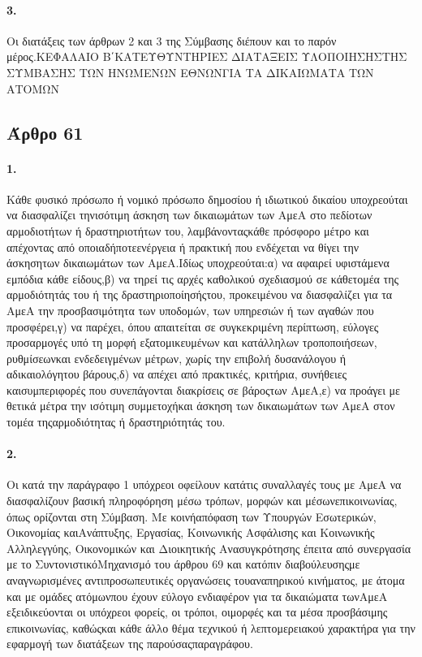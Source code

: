 \documentclass[a4paper,oneside, 10pt]{book}
\begin{document}
\paragraph { 3. } Οι διατάξεις των άρθρων 2 και 3 της Σύμβασης διέπουν και το παρόν μέρος.ΚΕΦΑΛΑΙΟ Β΄ΚΑΤΕΥΘΥΝΤΗΡΙΕΣ ΔΙΑΤΑΞΕΙΣ ΥΛΟΠΟΙΗΣΗΣΤΗΣ ΣΥΜΒΑΣΗΣ ΤΩΝ ΗΝΩΜΕΝΩΝ ΕΘΝΩΝΓΙΑ ΤΑ ΔΙΚΑΙΩΜΑΤΑ ΤΩΝ ΑΤΟΜΩΝ
\subsection*{ Άρθρο 61 }
\paragraph { 1. } Κάθε φυσικό πρόσωπο ή νομικό πρόσωπο δημοσίου ή ιδιωτικού δικαίου υποχρεούται να διασφαλίζει τηνισότιμη άσκηση των δικαιωμάτων των ΑμεΑ στο πεδίοτων αρμοδιοτήτων ή δραστηριοτήτων του, λαμβάνονταςκάθε πρόσφορο μέτρο και απέχοντας από οποιαδήποτεενέργεια ή πρακτική που ενδέχεται να θίγει την άσκησητων δικαιωμάτων των ΑμεΑ.Ιδίως υποχρεούται:α) να αφαιρεί υφιστάμενα εμπόδια κάθε είδους,β) να τηρεί τις αρχές καθολικού σχεδιασμού σε κάθετομέα της αρμοδιότητάς του ή της δραστηριοποίησήςτου, προκειμένου να διασφαλίζει για τα ΑμεΑ την προσβασιμότητα των υποδομών, των υπηρεσιών ή των αγαθών που προσφέρει,γ) να παρέχει, όπου απαιτείται σε συγκεκριμένη περίπτωση, εύλογες προσαρμογές υπό τη μορφή εξατομικευμένων και κατάλληλων τροποποιήσεων, ρυθμίσεωνκαι ενδεδειγμένων μέτρων, χωρίς την επιβολή δυσανάλογου ή αδικαιολόγητου βάρους,δ) να απέχει από πρακτικές, κριτήρια, συνήθειες καισυμπεριφορές που συνεπάγονται διακρίσεις σε βάροςτων ΑμεΑ,ε) να προάγει με θετικά μέτρα την ισότιμη συμμετοχήκαι άσκηση των δικαιωμάτων των ΑμεΑ στον τομέα τηςαρμοδιότητας ή δραστηριότητάς του.
\paragraph { 2. } Οι κατά την παράγραφο 1 υπόχρεοι οφείλουν κατάτις συναλλαγές τους με ΑμεΑ να διασφαλίζουν βασική πληροφόρηση μέσω τρόπων, μορφών και μέσωνεπικοινωνίας, όπως ορίζονται στη Σύμβαση. Με κοινήαπόφαση των Υπουργών Εσωτερικών, Οικονομίας καιΑνάπτυξης, Εργασίας, Κοινωνικής Ασφάλισης και Κοινωνικής Αλληλεγγύης, Οικονομικών και Διοικητικής Ανασυγκρότησης έπειτα από συνεργασία με το ΣυντονιστικόΜηχανισμό του άρθρου 69 και κατόπιν διαβούλευσηςμε αναγνωρισμένες αντιπροσωπευτικές οργανώσεις τουαναπηρικού κινήματος, με άτομα και με ομάδες ατόμωνπου έχουν εύλογο ενδιαφέρον για τα δικαιώματα τωνΑμεΑ εξειδικεύονται οι υπόχρεοι φορείς, οι τρόποι, οιμορφές και τα μέσα προσβάσιμης επικοινωνίας, καθώςκαι κάθε άλλο θέμα τεχνικού ή λεπτομερειακού χαρακτήρα για την εφαρμογή των διατάξεων της παρούσαςπαραγράφου.
\end{document}

